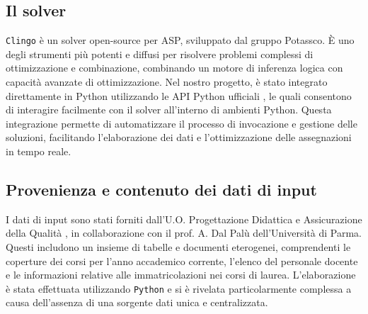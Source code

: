 \subsection{Il solver}
\texttt{Clingo} \cite{clingo} è un solver open-source per ASP, sviluppato dal gruppo Potassco.
È uno degli strumenti più potenti e diffusi per risolvere problemi complessi di
ottimizzazione e combinazione, combinando un motore di inferenza logica con
capacità avanzate di ottimizzazione. Nel nostro progetto, è stato integrato
direttamente in Python utilizzando le API Python ufficiali
\cite{clingo_python_api}, le quali consentono di interagire facilmente con il
solver all'interno di ambienti Python. Questa integrazione permette di
automatizzare il processo di invocazione e gestione delle soluzioni, facilitando
l'elaborazione dei dati e l'ottimizzazione delle assegnazioni in tempo reale.

\subsection{Provenienza e contenuto dei dati di input}

I dati di input sono stati forniti dall'U.O. Progettazione Didattica e
Assicurazione della Qualità \cite{unipr_qualita}, in collaborazione con il prof.
A. Dal Palù dell'Università di Parma. Questi includono un insieme di tabelle e
documenti eterogenei, comprendenti le coperture dei corsi per l'anno accademico
corrente, l'elenco del personale docente e le informazioni relative alle
immatricolazioni nei corsi di laurea. L'elaborazione è stata effettuata
utilizzando \texttt{Python} e si è rivelata particolarmente complessa a causa
dell'assenza di una sorgente dati unica e centralizzata.

